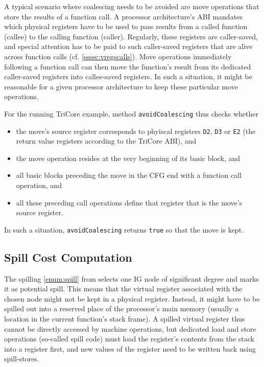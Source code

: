 A typical scenario where coalescing needs to be avoided are move operations that store the results of a function call.
A processor architecture's \gls{ABI} mandates which physical registers have to be used to pass results from a called function (callee) to the calling function (caller).
Regularly, these registers are caller-saved, and special attention has to be paid to such caller-saved registers that are alive across function calls (cf. \cref{sssec:vregscalls}).
Move operations immediately following a function call can then move the function's result from its dedicated caller-saved registers into callee-saved registers.
In such a situation, it might be reasonable for a given processor architecture to keep these particular move operations.

For the running TriCore example, method \texttt{avoidCoalescing} thus checks whether
\begin{itemize}
  \item the move's source register corresponds to phyiscal registers \texttt{D2}, \texttt{D3} or \texttt{E2} (the return value registers according to the TriCore \gls{ABI}), and
  \item the move operation resides at the very beginning of its basic block, and
  \item all basic blocks preceding the move in the \gls{CFG} end with a function call operation, and
  \item all these preceding call operations define that register that is the move's source register.
\end{itemize}
In such a situation, \texttt{avoidCoalescing} returns \texttt{true} so that the move is kept.


\subsection{Spill Cost Computation}
\label{ssec:spillcosts}

The spilling \cref{enum:spill} from  selects one \gls{IG} node of significant degree and marks it as potential spill.
This means that the virtual register associated with the chosen node might not be kept in a physical register.
Instead, it might have to be spilled out into a reserved place of the processor's main memory (usually a location in the current function's stack frame).
A spilled virtual register thus cannot be directly accessed by machine operations, but dedicated load and store operations (so-called spill code) must load the register's contents from the stack into a register first, and new values of the register need to be written back using spill-stores.

